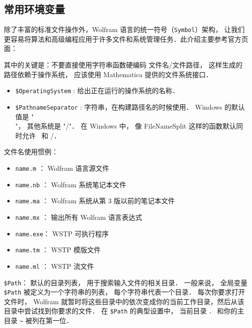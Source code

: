 
\begin{issues}
\issueDraft
\issueTODO
\end{issues}

\subsection{常用环境变量}

除了丰富的标准文件操作外，Wolfram 语言的统一符号（\verb`Symbol`）架构，
让我们更容易将算法和高级编程应用于许多文件和系统管理任务．此介绍主要参考官方页面：


其中的关键是：不要直接使用字符串函数硬编码 文件名/文件路径， 
这样生成的路径依赖于操作系统， 应该使用 Mathematica 提供的文件系统接口．

\begin{itemize}
\item \verb`$OperatingSystem` : 给出正在运行的操作系统的名称．
\item \verb`$PathnameSeparator` : 字符串，在构建路径名的时候使用． 
Windows 的默认值是 "\\"， 其他系统是 "/"．
在 Windows 中， 像 FileNameSplit 这样的函数默认同时允许 \ 和 /．
\end{itemize}

文件名使用惯例：

\begin{itemize}
\item \verb`name.m`  ： Wolfram 语言源文件
\item \verb`name.nb` ： Wolfram 系统笔记本文件
\item \verb`name.ma` ： Wolfram 系统从第 $3$ 版以前的笔记本文件
\item \verb`name.mx` ： 输出所有 Wolfram 语言表达式
\item \verb`name.exe`： WSTP 可执行程序
\item \verb`name.tm` ： WSTP 模版文件
\item \verb`name.ml` ： WSTP 流文件
\end{itemize}


\verb`$Path`： 默认的目录列表， 用于搜索输入文件的相关目录． 
一般来说， 全局变量 \verb`$Path` 被定义为一个字符串的列表， 每个字符串代表一个目录．
每次你要求打开文件时， Wolfram 就暂时将这些目录中的依次变成你的当前工作目录，然后从该目录中尝试找到你要求的文件．
在 \verb`$Path` 的典型设置中， 当前目录 \verb`．` 和你的主目录 \verb`~` 被列在第一位．

